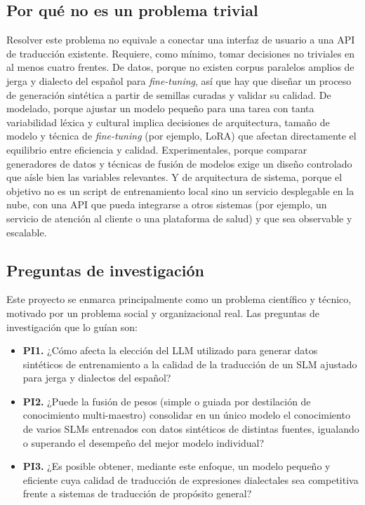 \documentclass[11pt,a4paper]{article}
\begin{document}
\subsection{Por qué no es un problema trivial}

Resolver este problema no equivale a conectar una interfaz de usuario a una API de traducción existente. Requiere, como mínimo, tomar decisiones no triviales en al menos cuatro frentes. De datos, porque no existen corpus paralelos amplios de jerga y dialecto del español para \textit{fine-tuning}, así que hay que diseñar un proceso de generación sintética a partir de semillas curadas y validar su calidad. De modelado, porque ajustar un modelo pequeño para una tarea con tanta variabilidad léxica y cultural implica decisiones de arquitectura, tamaño de modelo y técnica de \textit{fine-tuning} (por ejemplo, LoRA) que afectan directamente el equilibrio entre eficiencia y calidad. Experimentales, porque comparar generadores de datos y técnicas de fusión de modelos exige un diseño controlado que aísle bien las variables relevantes. Y de arquitectura de sistema, porque el objetivo no es un script de entrenamiento local sino un servicio desplegable en la nube, con una API que pueda integrarse a otros sistemas (por ejemplo, un servicio de atención al cliente o una plataforma de salud) y que sea observable y escalable.

\subsection{Preguntas de investigación}

Este proyecto se enmarca principalmente como un problema científico y técnico, motivado por un problema social y organizacional real. Las preguntas de investigación que lo guían son:

\begin{itemize}
    \item \textbf{PI1.} ¿Cómo afecta la elección del LLM utilizado para generar datos sintéticos de entrenamiento a la calidad de la traducción de un SLM ajustado para jerga y dialectos del español?
    \item \textbf{PI2.} ¿Puede la fusión de pesos (simple o guiada por destilación de conocimiento multi-maestro) consolidar en un único modelo el conocimiento de varios SLMs entrenados con datos sintéticos de distintas fuentes, igualando o superando el desempeño del mejor modelo individual?
    \item \textbf{PI3.} ¿Es posible obtener, mediante este enfoque, un modelo pequeño y eficiente cuya calidad de traducción de expresiones dialectales sea competitiva frente a sistemas de traducción de propósito general?
\end{itemize}
\end{document}
